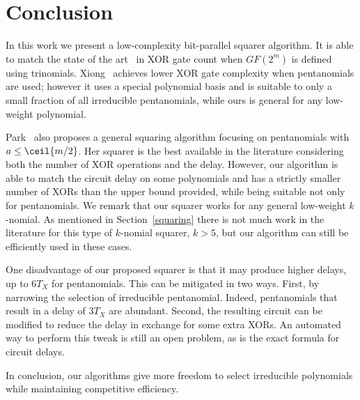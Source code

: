 
\section{Conclusion} \label{conclusion}

In this work we present a low-complexity bit-parallel squarer algorithm. It is able to match the state of the art~\cite{wu2002bit} in XOR gate count when $GF(2^m)$ is defined using trinomials. Xiong~\cite{xiong2014gf} achieves lower XOR gate complexity when pentanomials are used; however it uses a special polynomial basis and is suitable to only a small fraction of all irreducible pentanomials, while ours is general for any low-weight polynomial.

Park~\cite{park2012explicit} also proposes a general squaring algorithm focusing on pentanomials with $a \leq \ceil{m/2}$. Her squarer is the best available in the literature considering both the number of XOR operations and the delay. However, our algorithm is able to match the circuit delay on some polynomials and has a strictly smaller number of XORs than the upper bound provided, while being suitable not only for pentanomials. 
We remark that our squarer works for any general low-weight $k$-nomial. As mentioned in Section~\ref{squaring} there is not much work in the literature for this type of $k$-nomial squarer, $k>5$, but our algorithm can still be efficiently used in these cases.

One disadvantage of our proposed squarer is that it may produce higher delays, up to $6 T_X$ for pentanomials. This can be mitigated in two ways. First, by narrowing the selection of irreducible pentanomial. Indeed,  pentanomials that result in a delay of $3 T_X$ are abundant. Second, the resulting circuit can be modified to reduce the delay in exchange for some extra XORs. An automated way to perform this tweak is still an open problem, as is the exact formula for circuit delays.

In conclusion, our algorithms give more freedom to select irreducible polynomials while maintaining competitive efficiency.
